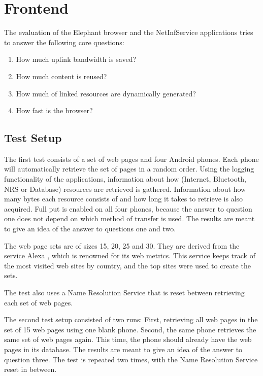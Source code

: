 \section{Frontend}

The evaluation of the Elephant browser and the NetInfService applications tries to answer the following core questions:

\begin{enumerate}
\item How much uplink bandwidth is saved?
\item How much content is reused?
\item How much of linked resources are dynamically generated?
\item How fast is the browser?
\end{enumerate}

\subsection{Test Setup}

The first test consists of a set of web pages and four Android phones. Each phone will automatically retrieve the set of pages in a random order.
Using the logging functionality of the 
applications, information about how (Internet, Bluetooth, NRS or Database) 
resources are retrieved is gathered. Information about how many bytes each resource consists of 
and how long it takes to retrieve is also acquired. Full put is 
enabled on all four phones, because the answer to question one 
does not depend on which method of transfer is used. 
The results are meant to give an idea of the answer to 
questions one and two.

The web page sets are of sizes 15, 20, 25 and 30. 
They are derived from the service Alexa \cite{alexa},
which is renowned for its web metrics. 
This service keeps track of the most visited web sites by country, 
and the top sites were used to create the sets.

The test also uses a 
Name Resolution Service that is reset between retrieving each set of web pages.

The second test setup consisted of two runs: First, 
retrieving all web pages in the set of 15 web pages using one blank
phone. Second, the same phone retrieves the same set of web pages again. This time, the phone should already have the web pages in its database.
The results are meant to give an idea of the answer to question three. 
The test is repeated two times, with the Name Resolution Service 
reset in between. 


